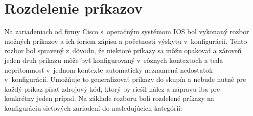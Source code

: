 \section{Rozdelenie príkazov}
\label{rozdelenie_prikazov}
Na zariadeniach od firmy Cisco s~operačným systémom IOS bol vykonaný rozbor možných príkazov a ich foriem zápisu a početnosti výskytu v~konfigurácií. Tento rozbor bol spravený z~dôvodu, že niektoré príkazy sa môžu opakovať a zároveň jeden druh príkazu môže byť konfigurovaný v~rôznych kontextoch a teda neprítomnosť v~jednom kontexte automaticky neznamená nedostatok v~konfigurácií. Umožňuje to generalizovať príkazy do skupín a nebude nutné pre každý príkaz písať zdrojový kód, ktorý by riešil nález a  nápravu iba pre konkrétny jeden prípad. Na základe rozboru boli rozdelené príkazy na konfiguráciu sieťových zariadení do nasledujúcich kategórií:
\\
